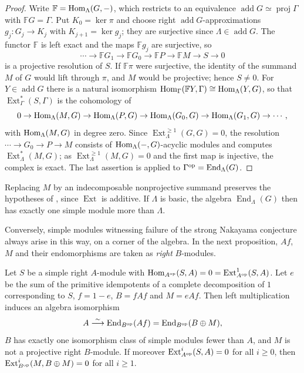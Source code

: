 \begin{proof}
  Write ${\mathbb{F}=\Hom[\Lambda]{G}{-}}$, which restricts to an equivalence
  ${\operatorname{add}G\simeq\operatorname{proj}\Gamma}$ with
  ${\mathbb{F}G=\Gamma}$.
  Put ${K_0=\ker\pi}$ and choose right $\operatorname{add}G$-approximations
  ${g_j\colon G_j\to K_j}$ with ${K_{j+1}=\ker g_j}$; they are surjective since
  ${\Lambda\in\operatorname{add}G}$. The functor $\mathbb{F}$ is left exact and
  the
  maps $\mathbb{F}g_j$ are surjective, so
  \[
    \cdots\to\mathbb{F}G_1\to\mathbb{F}G_0\to\mathbb{F}P\to\mathbb{F}M\to S\to0
  \]
  is a projective resolution of $S$. If $\mathbb{F}\pi$ were surjective, the
  identity of the summand $M$ of $G$ would lift through $\pi$, and $M$ would be
  projective; hence ${S\neq0}$. For ${Y\in\operatorname{add}G}$ there is a natural
  isomorphism ${\Hom[\Gamma]{\mathbb{F}Y}{\Gamma}\cong\Hom[\Lambda]{Y}{G}}$, so
  that
  $\operatorname{Ext}^*_\Gamma(S,\Gamma)$ is the cohomology of
  \[
    0\to\Hom[\Lambda]{M}{G}\to\Hom[\Lambda]{P}{G}\to\Hom[\Lambda]{G_0}{G}\to
    \Hom[\Lambda]{G_1}{G}\to\cdots,
  \]
  with $\Hom[\Lambda]{M}{G}$ in degree zero. Since
  ${\operatorname{Ext}^{\geq1}_\Lambda(G,G)}={0}$, the resolution
  ${\cdots}\to{ G_0}\to{ P}\to{ M}$ consists of $\Hom[\Lambda]{-}{G}$-acyclic modules
  and
  computes $\operatorname{Ext}^*_\Lambda(M,G)$; as
  ${\operatorname{Ext}^{\geq1}_\Lambda(M,G)}={0}$ and the first map is injective,
  the complex is exact. The last assertion is  applied
  to ${\Gamma^{\mathrm{op}}}={\operatorname{End}_\Lambda(G)}$.
\end{proof}

Replacing $M$ by an indecomposable nonprojective summand preserves the
hypotheses of , since $\operatorname{Ext}$ is additive.
If $\Lambda$ is basic, the algebra $\operatorname{End}_\Lambda(G)$ then has
exactly one simple module more than $\Lambda$.

Conversely, simple modules witnessing failure of the strong Nakayama conjecture
always arise in this
way, on a corner of the algebra. In the next proposition, $Af$, $M$ and their
endomorphisms are taken as \emph{right} $B$-modules.

\begin{proposition}
  \label{prop:simple-witness}
  Let $S$ be a simple right $A$-module with
  ${\Hom[A^{\op}]{S}{A}}={0}={\operatorname{Ext}^1_{A^{\op}}(S,A)}$. Let $e$ be the
  sum
  of the primitive idempotents of a complete decomposition of $1$ corresponding
  to $S$, ${f=1-e}$, ${B=fAf}$ and ${M=eAf}$. Then left multiplication induces an
  algebra isomorphism
  \[
    A\stackrel{\sim}{\longrightarrow}\operatorname{End}_{B^{\mathrm{op}}}(Af)
    =\operatorname{End}_{B^{\mathrm{op}}}(B\oplus M),
  \]
  $B$ has exactly one isomorphism class of simple modules fewer than $A$, and
  $M$ is not a projective right $B$-module. If moreover
  ${\operatorname{Ext}^i_{A^{\mathrm{op}}}(S,A)=0}$ for all ${i\geq0}$, then
  ${\operatorname{Ext}^i_{B^{\mathrm{op}}}(M,B\oplus M)=0}$ for all ${i\geq1}$.
\end{proposition}


